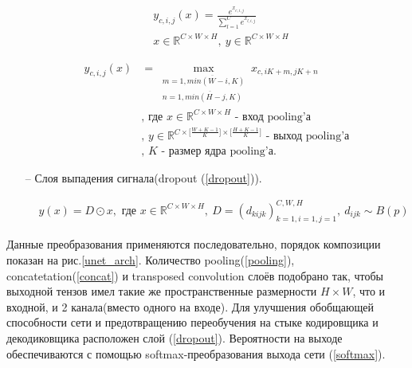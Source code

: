 \documentclass[12pt, a4paper]{extarticle}
\begin{document}
\begin{itemize}
\begin{equation} \label{softmax}
\begin{aligned}
	& y_{c, i, j}(x) = \frac{ e^{x_{c, i, j}} }
		{ \sum \limits_{l=1}^{C} e^{x_{l, i, j}} } \\
	& x \in \mathbb{R}^{C \times W \times H}
		,\ y \in \mathbb{R}^{C \times W \times H}
\end{aligned}
\end{equation}

\begin{equation} \label{pooling}
\begin{aligned}
	y_{c, i, j}(x) & = \max \limits_{
		\substack{
			m=\overline{1, min(W - i, K)}
			\\ n=\overline{1, min(H - j, K)}}}
		x_{c, i K + m, j K + n} \\
	& \text{, где $x \in \mathbb{R}^{C \times W \times H}$ 
		- вход pooling'а} \\
	& \text{, $y \in \mathbb{R}
		^{C 
		  \times \bigl[ \frac{W + K - 1}{K} \bigr] 
		  \times \bigl[ \frac{H + K - 1}{K} \bigr] }$ 
		- выход pooling'а} \\
	& \text{, $K$ - размер ядра pooling'а}.
\end{aligned}
\end{equation}

	\item[--] Слоя выпадения сигнала(dropout (\ref{dropout})).

\begin{equation} \label{dropout}
\begin{aligned}
	&y(x) = D \odot x, \text{ где
		$x \in \mathbb{R}^{C \times W \times H},\ 
		D = (d_{kijk})_{k=1,i=1,j=1}^{C, W, H},\ d_{ijk} \sim B(p)$}
\end{aligned}
\end{equation}

\end{itemize}
	
Данные преобразования применяются последовательно, порядок композиции показан на рис.\ref{unet_arch}. 
Количество pooling(\ref{pooling}), concatetation(\ref{concat}) и
transposed convolution слоёв подобрано так, чтобы выходной тензов имел такие же пространственные размерности $H \times W$, что и входной, и 2 канала(вместо одного на входе). Для улучшения обобщающей способности сети и предотвращению переобучения на стыке кодировщика и декодиковщика расположен слой (\ref{dropout}). Вероятности на выходе обеспечиваются с помощью 
softmax-преобразования выхода сети (\ref{softmax}). 
\end{document}

